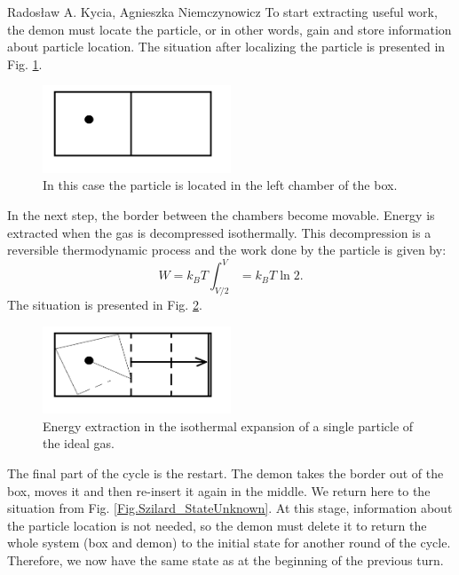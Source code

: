 \begin{artengenv2auth}{Rados\l aw A. Kycia, Agnieszka Niemczynowicz}
To start extracting useful work, the demon must locate the particle, or in other words, gain and store information about particle location. The situation after localizing the particle is presented in Fig. \ref{Fig.Szilard_ParticleLocated}.
\begin{figure}
\centering
 \includegraphics[width=0.5\textwidth]{ART_Kycia_Niemczynowicz/Demon2.png}
 \caption{In this case the particle is located in the left chamber of the box.}
 \label{Fig.Szilard_ParticleLocated}
\end{figure}

In the next step, the border between the chambers become movable. Energy is extracted when the gas is decompressed isothermally. This decompression is a reversible thermodynamic process and the work done by the particle is given by: 
\begin{equation}
 W=k_{B}T\int_{V/2}^{V}=k_{B}T \ln{2}.
\end{equation}
The situation is presented in Fig. \ref{Fig.Szilard_WorkExtraction}.
\begin{figure}
\centering
 \includegraphics[width=0.5\textwidth]{ART_Kycia_Niemczynowicz/Demon3.png}
 \caption{Energy extraction in the isothermal expansion of a single particle of the ideal gas.}
 \label{Fig.Szilard_WorkExtraction}
\end{figure}

The final part of the cycle is the restart. The demon takes the border out of the box, moves it and then re-insert it again in the middle. We return here to the situation from Fig. \ref{Fig.Szilard_StateUnknown}. At this stage, information about the particle location is not needed, so the demon must delete it to return the whole system (box and demon) to the initial state for another round of the cycle. Therefore, we now have the same state as at the beginning of the previous turn.


\end{artengenv2auth}
